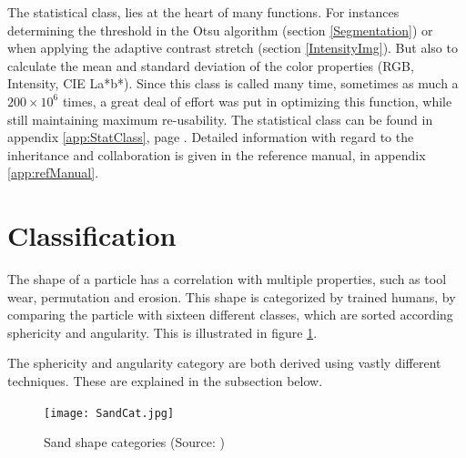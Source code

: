 \documentclass[11pt,fleqn,,a4paper,twoside,openright]{book}
\begin{document}
\begin{remark}
	The statistical class, lies at the heart of many functions. For instances determining the threshold in the Otsu algorithm (section \ref{Segmentation}) or when  applying the adaptive contrast stretch (section \ref{IntensityImg}). But also to calculate the mean and standard deviation of the color properties (RGB, Intensity, CIE La*b*). Since this class is called many time, sometimes as much a $ 200 \times 10^{6} $ times, a great deal of effort was put in optimizing this function, while still maintaining maximum re-usability. The statistical class can be found in appendix \ref{app:StatClass}, page \pageref{app:StatClass}. Detailed information with regard to the inheritance and collaboration is given in the reference manual, in appendix \ref{app:refManual}.
\end{remark}


\section{Classification}
The shape of a particle has a correlation with multiple properties, such as tool wear, permutation and erosion. This shape is categorized by trained humans, by comparing the particle with sixteen different classes, which are sorted according sphericity and angularity. This is illustrated in figure \ref{fig:Sandcat}.

The sphericity and angularity category are both derived using vastly different techniques. These are explained in the subsection below.

\begin{figure}[h]
	\texttt{[image: SandCat.jpg]}
	\caption{Sand shape categories (Source: \citeauthor{miller2010quantifying} \cite{miller2010quantifying})}\label{fig:Sandcat}
\end{figure}
\end{document}
